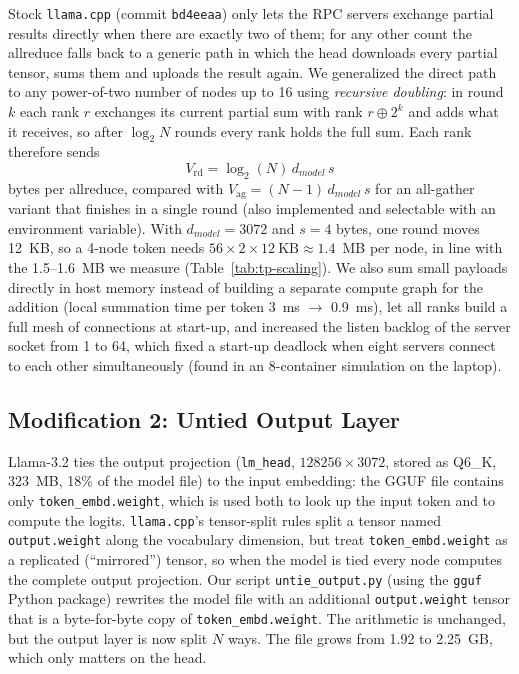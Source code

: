 \documentclass[11pt,a4paper]{article}
\begin{document}
Stock \texttt{llama.cpp} (commit \texttt{bd4eeaa}) only lets the RPC servers exchange partial results directly when there are exactly two of them; for any other count the allreduce falls back to a generic path in which the head downloads every partial tensor, sums them and uploads the result again. We generalized the direct path to any power-of-two number of nodes up to 16 using \emph{recursive doubling}: in round $k$ each rank $r$ exchanges its current partial sum with rank $r \oplus 2^k$ and adds what it receives, so after $\log_2 N$ rounds every rank holds the full sum. Each rank therefore sends
\begin{equation}
V_{\text{rd}} = \log_2(N)\, d_{model}\, s
\label{eq:rd}
\end{equation}
bytes per allreduce, compared with $V_{\text{ag}} = (N-1)\, d_{model}\, s$ for an all-gather variant that finishes in a single round (also implemented and selectable with an environment variable). With $d_{model}=3072$ and $s=4$ bytes, one round moves 12~KB, so a 4-node token needs $56 \times 2 \times 12~\text{KB} \approx 1.4$~MB per node, in line with the 1.5--1.6~MB we measure (Table~\ref{tab:tp-scaling}). We also sum small payloads directly in host memory instead of building a separate compute graph for the addition (local summation time per token 3~ms $\rightarrow$ 0.9~ms), let all ranks build a full mesh of connections at start-up, and increased the listen backlog of the server socket from 1 to 64, which fixed a start-up deadlock when eight servers connect to each other simultaneously (found in an 8-container simulation on the laptop).

\subsection{Modification 2: Untied Output Layer}\label{sec:untied}

Llama-3.2 ties the output projection (\texttt{lm\_head}, $128256 \times 3072$, stored as Q6\_K, 323~MB, 18\% of the model file) to the input embedding: the GGUF file contains only \texttt{token\_embd.weight}, which is used both to look up the input token and to compute the logits. \texttt{llama.cpp}'s tensor-split rules split a tensor named \texttt{output.weight} along the vocabulary dimension, but treat \texttt{token\_embd.weight} as a replicated (``mirrored'') tensor, so when the model is tied every node computes the complete output projection. Our script \texttt{untie\_output.py} (using the \texttt{gguf} Python package) rewrites the model file with an additional \texttt{output.weight} tensor that is a byte-for-byte copy of \texttt{token\_embd.weight}. The arithmetic is unchanged, but the output layer is now split $N$ ways. The file grows from 1.92 to 2.25~GB, which only matters on the head.
\end{document}

